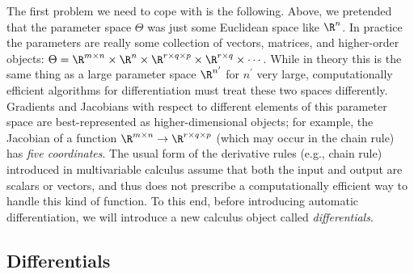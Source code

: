 \documentclass[../../book-main.tex]{subfiles}
\begin{document}
The first problem we need to cope with is the following. Above, we pretended that the parameter space \(\Theta\) was just some Euclidean space like \(\R^{n}\). In practice the parameters are really some collection of vectors, matrices, and higher-order objects: \(\Theta = \R^{m \times n} \times \R^{n} \times \R^{r \times q \times p} \times \R^{r \times q} \times \cdots\). While in theory this is the same thing as a large parameter space \(\R^{n^{\prime}}\) for \(n^{\prime}\) very large, computationally efficient algorithms for differentiation must treat these two spaces differently. Gradients and Jacobians with respect to different elements of this parameter space are best-represented as higher-dimensional objects; for example, the Jacobian of a function \(\R^{m \times n} \to \R^{r \times q \times p}\) (which may occur in the chain rule) has \textit{five coordinates}. The usual form of the derivative rules (e.g., chain rule) introduced in multivariable calculus assume that both the input and output are scalars or vectors, and thus does not prescribe a computationally efficient way to handle this kind of function. To this end, before introducing automatic differentiation, we will introduce a new calculus object called \textit{differentials}. 

\subsection{Differentials}
\end{document}
